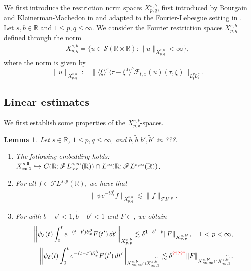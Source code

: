 \documentclass[a4paper, 11pt]{amsart}
\newcommand{\R}{\mathbb{R}}
\newcommand{\jap}[1]{\langle #1 \rangle}
\theoremstyle{plain}
\newtheorem{lem}[thm]{Lemma}
\theoremstyle{definition}
\theoremstyle{remark}
\newcommand{\5}{\text{V}}
\newcommand{\FL}{\mathcal{F} L}
\newcommand{\les}{\lesssim}
\newcommand{\dl}{\delta}
\newcommand{\F}{\mathcal{F}}
\newcommand{\wt}{\widetilde}
\newcommand{\embeds}{\hookrightarrow}
\newcommand{\dx}{\partial_x}
\numberwithin{equation}{section}
\theoremstyle{mytheoremstyle} \newtheorem{nota}[thm]{Remark}
\theoremstyle{mytheoremstyle} \newtheorem{exemplo}[thm]{Example}
\newcommand{\red}{\color{red}}
\begin{document}
We first introduce the restriction norm spaces $X^{s,b}_{p,q}$, first introduced by Bourgain and Klainerman-Machedon in \cite{} and adapted to the Fourier-Lebesgue setting in \cite{}.
%
%
Let $s,b\in \R$ and $1\le p,q \le \infty$. We consider the Fourier restriction spaces $X^{s,b}_{p,q}$ defined through the norm
\begin{align*}
X^{s,b}_{p,q} =\{ u\in \mathcal{S}(\R\times \R) : \|u\|_{X^{s,b}_{p,q}}<\infty\}, 
\end{align*}
where the norm is given by
\begin{equation}
\| u \|_{X^{s,b}_{p,q}} := \| \jap{\xi}^s \jap{\tau-\xi^3}^b \F_{t,x}(u) (\tau, \xi) \|_{L^p_\xi L^q_\tau}.
\end{equation}


\subsection{Linear estimates}






We first establish some properties of the $X^{s,b}_{p,q}$-spaces.
\begin{lem}
Let $s\in \R$, $1\le p,q \le \infty$, and {\red $b,\wt{b}, b', \wt{b}'$ in ???}.


\smallskip

\begin{enumerate}
\item[\rm(i)] The following embedding holds: $X^{s,0}_{\infty, 1} \embeds C(\R; \FL_{\textup{loc}}^{s,\infty}(\R)) \cap L^\infty(\R; \FL^{s,\infty}(\R))$.

\smallskip


\item[\rm(ii)] For all $f \in \FL^{s,p}(\R)$, we have that
\begin{align}
\label{lin1}
\| \psi e^{-t\dx^3} f \|_{X^{s,b}_{p,q}} \les \| f \|_{\FL^{s,p}}.
\end{align}



\item[\rm(iii)] For {\red with $b-b'<1, \wt{b}-\wt{b}'<1$} and $F\in $, we obtain
\begin{align}
\label{lin2a}
\bigg\| \psi_\dl (t) \int_0^t e^{-(t-t')\dx^3 } F(t') \, dt' \bigg\|_{X^{s,b}_{p,p} } \les \dl^{1+b'-b} \| F \|_{X^{s,b'}_{p,p}}, \quad 1<p<\infty, \\
\label{lin2}
\bigg\| \psi_\dl (t) \int_0^t e^{-(t-t')\dx^3 } F(t') \, dt' \bigg\|_{X^{s,b}_{\infty,\infty} \cap X^{s,\wt{b}}_{\infty, 1}} \les \dl^{\red ?????} \| F \|_{X^{s,b'}_{\infty, \infty} \cap X^{s,\wt{b}'}_{\infty, 1}}.
\end{align}

\end{enumerate}

\end{lem}
\end{document}
